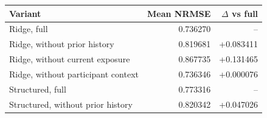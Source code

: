 \footnotesize\setlength{\tabcolsep}{3pt}\begin{tabular*}{\columnwidth}{@{\extracolsep{\fill}}lrr}
\toprule
Variant & Mean NRMSE & $\Delta$ vs full \\
\midrule
Ridge, full & 0.736270 & -- \\
Ridge, without prior history & 0.819681 & +0.083411 \\
Ridge, without current exposure & 0.867735 & +0.131465 \\
Ridge, without participant context & 0.736346 & +0.000076 \\
Structured, full & 0.773316 & -- \\
Structured, without prior history & 0.820342 & +0.047026 \\
\bottomrule
\end{tabular*}
